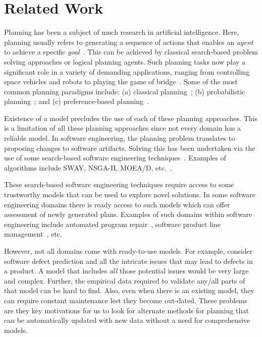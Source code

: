 \documentclass[conference]{IEEEtran}
\theoremstyle{break}
\begin{document}
\section{Related Work}

Planning  has been a subject of much research in artificial intelligence. Here, planning usually refers to generating a sequence of actions that enables an \textit{agent} to achieve a specific \textit{goal}~\cite{norvig}. This can be achieved by classical search-based problem solving  approaches or logical planning agents. Such planning tasks now play a significant role in a variety of demanding applications, ranging from controlling space vehicles and robots to playing the game of bridge~\cite{ghallab04}. Some of the most common planning paradigms include: (a) classical planning~\cite{wooldridge95}; (b) probabilistic planning~\cite{Bel, altman99, guo2009}; and (c) preference-based planning~\cite{son06, baier09}. 

Existence of a model precludes the use of each of these planning approaches. This is a limitation of all these planning approaches since not every domain has a reliable model. In software engineering, the planning problem translates to proposing changes to software artifacts. Solving this has been undertaken via the use of some search-based software engineering techniques~\cite{Harman2009}. Examples of algorithms include SWAY, NSGA-II, MOEA/D, etc.~\cite{nair2016accidental,deb00a,zit02}.

These search-based software engineering techniques require access to some trustworthy models that can be used to explore novel solutions. In some software engineering domains there is ready access to such models which can offer assessment of newly generated plans. Examples of such domains within software engineering include automated program repair~\cite{Weimer2009, LeGoues2015}, software product line management~\cite{sayyad13, henard15}, etc.

However, not all domains come with ready-to-use models. For example, consider software defect prediction and all the intricate issues that may lead to defects in a product. A model that includes {\em all} those potential issues would be very large and complex. Further, the empirical data required to validate any/all parts of that model can be hard to find. Also, even when there is an existing model, they can require constant  maintenance lest they become out-dated. These problems are they key motivations for us to look for alternate methods for planning that can be automatically updated with new data without a need for comprehensive models.
\end{document}
